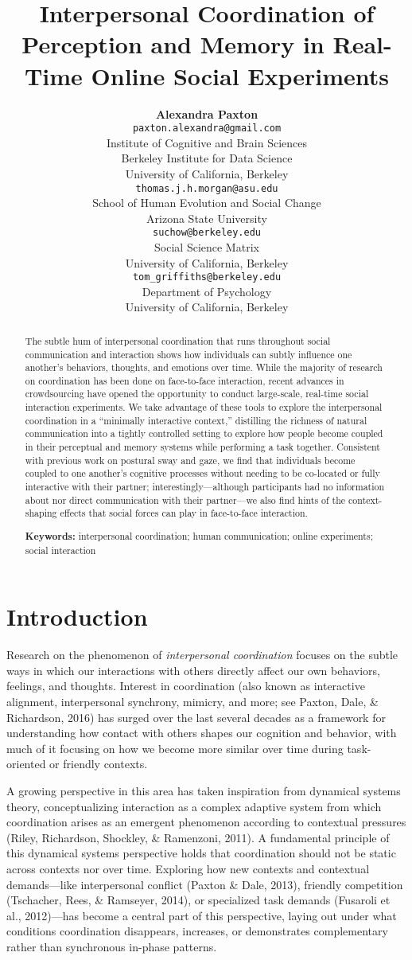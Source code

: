 \documentclass[10pt, letterpaper]{article}
\title{Interpersonal Coordination of Perception and Memory in Real-Time Online
Social Experiments}
\author{{\large \bf Alexandra Paxton} \\ \texttt{paxton.alexandra@gmail.com} \\ Institute of Cognitive and Brain Sciences \\ Berkeley Institute for Data Science \\ University of California, Berkeley \And {\large \bf Thomas J. H. Morgan} \\ \texttt{thomas.j.h.morgan@asu.edu} \\ School of Human Evolution and Social Change \\ Arizona State University \AND {\large \bf Jordan W. Suchow} \\ \texttt{suchow@berkeley.edu} \\ Social Science Matrix \\ University of California, Berkeley \And {\large \bf Thomas L. Griffiths} \\ \texttt{tom\_griffiths@berkeley.edu} \\ Department of Psychology \\ University of California, Berkeley}
\begin{document}
\maketitle

\begin{abstract}
The subtle hum of interpersonal coordination that runs throughout social
communication and interaction shows how individuals can subtly influence
one another's behaviors, thoughts, and emotions over time. While the
majority of research on coordination has been done on face-to-face
interaction, recent advances in crowdsourcing have opened the
opportunity to conduct large-scale, real-time social interaction
experiments. We take advantage of these tools to explore the
interpersonal coordination in a ``minimally interactive context,''
distilling the richness of natural communication into a tightly
controlled setting to explore how people become coupled in their
perceptual and memory systems while performing a task together.
Consistent with previous work on postural sway and gaze, we find that
individuals become coupled to one another's cognitive processes without
needing to be co-located or fully interactive with their partner;
interestingly---although participants had no information about nor
direct communication with their partner---we also find hints of the
context-shaping effects that social forces can play in face-to-face
interaction.

\textbf{Keywords:}
interpersonal coordination; human communication; online experiments;
social interaction
\end{abstract}

\section{Introduction}\label{introduction}

Research on the phenomenon of \emph{interpersonal coordination} focuses
on the subtle ways in which our interactions with others directly affect
our own behaviors, feelings, and thoughts. Interest in coordination
(also known as interactive alignment, interpersonal synchrony, mimicry,
and more; see Paxton, Dale, \& Richardson, 2016) has surged over the
last several decades as a framework for understanding how contact with
others shapes our cognition and behavior, with much of it focusing on
how we become more similar over time during task-oriented or friendly
contexts.

A growing perspective in this area has taken inspiration from dynamical
systems theory, conceptualizing interaction as a complex adaptive system
from which coordination arises as an emergent phenomenon according to
contextual pressures (Riley, Richardson, Shockley, \& Ramenzoni, 2011).
A fundamental principle of this dynamical systems perspective holds that
coordination should not be static across contexts nor over time.
Exploring how new contexts and contextual demands---like interpersonal
conflict (Paxton \& Dale, 2013), friendly competition (Tschacher, Rees,
\& Ramseyer, 2014), or specialized task demands (Fusaroli et al.,
2012)---has become a central part of this perspective, laying out under
what conditions coordination disappears, increases, or demonstrates
complementary rather than synchronous in-phase patterns.
\end{document}

